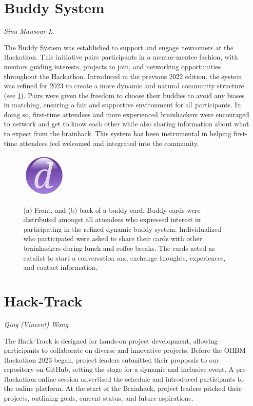 \documentclass{article}
\newcommand\coordinator[1]{\begin{flushleft}\small\textit{#1}\end{flushleft}}
\begin{document}
\section{Buddy System}
\coordinator{Sina Mansour L.}

The Buddy System was established to support and engage newcomers at the Hackathon.
This initiative pairs participants in a mentor-mentee fashion, with mentors guiding interests, projects to join, and networking opportunities throughout the Hackathon.
Introduced in the previous 2022 edition, the system was refined for 2023 to create a more dynamic and natural community structure (see \ref{fig:buddy-system}).
Pairs were given the freedom to choose their buddies to avoid any biases in matching, ensuring a fair and supportive environment for all participants.
In doing so, first-time attendees and more experienced brainhackers were encouraged to network and get to know each other while also sharing information about what to expect from the brainhack.
This system has been instrumental in helping first-time attendees feel welcomed and integrated into the community.

\begin{figure}[h]
    \centering
    \includegraphics[width=0.2\textwidth]{images/placeholder.png}
    \label{fig:buddy-system}
    \caption{
        (a) Front, and (b) back of a buddy card.
        Buddy cards were distributed amongst all attendees who expressed interest in participating in the refined dynamic buddy system.
        Individualized who participated were asked to share their cards with other brainhackers during lunch and coffee breaks.
        The cards acted as catalist to start a conversation and exchange thoughts, experiences, and contact information.
    }
\end{figure}

\section{Hack-Track}
\coordinator{Qing (Vincent) Wang}

The Hack-Track is designed for hands-on project development, allowing participants to collaborate on diverse and innovative projects.
Before the OHBM Hackathon 2023 began, project leaders submitted their proposals to our repository on GitHub, setting the stage for a dynamic and inclusive event.
A pre-Hackathon online session advertised the schedule and introduced participants to the online platform.
At the start of the Brainhack, project leaders pitched their projects, outlining goals, current status, and future aspirations.
\end{document}
